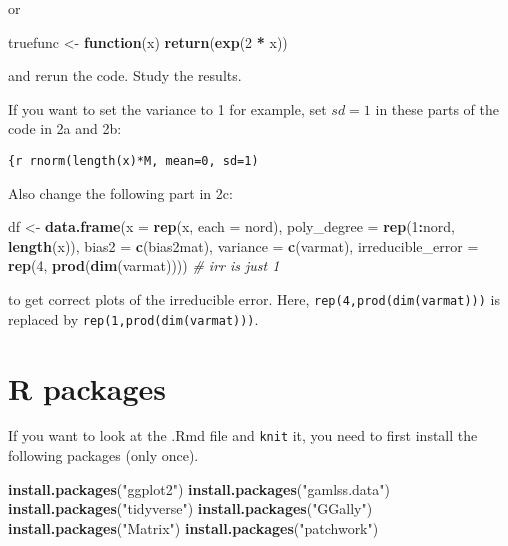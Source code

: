\documentclass[
]{article}
\newenvironment{Shaded}{\begin{snugshade}}{\end{snugshade}}
\newcommand{\AttributeTok}[1]{\textcolor[rgb]{0.13,0.29,0.53}{#1}}
\newcommand{\CommentTok}[1]{\textcolor[rgb]{0.56,0.35,0.01}{\textit{#1}}}
\newcommand{\ControlFlowTok}[1]{\textcolor[rgb]{0.13,0.29,0.53}{\textbf{#1}}}
\newcommand{\DecValTok}[1]{\textcolor[rgb]{0.00,0.00,0.81}{#1}}
\newcommand{\FunctionTok}[1]{\textcolor[rgb]{0.13,0.29,0.53}{\textbf{#1}}}
\newcommand{\NormalTok}[1]{#1}
\newcommand{\OtherTok}[1]{\textcolor[rgb]{0.56,0.35,0.01}{#1}}
\newcommand{\SpecialCharTok}[1]{\textcolor[rgb]{0.81,0.36,0.00}{\textbf{#1}}}
\newcommand{\StringTok}[1]{\textcolor[rgb]{0.31,0.60,0.02}{#1}}
\begin{document}
or

\begin{Shaded}
\begin{Highlighting}[]
\NormalTok{truefunc }\OtherTok{\textless{}{-}} \ControlFlowTok{function}\NormalTok{(x) }\FunctionTok{return}\NormalTok{(}\FunctionTok{exp}\NormalTok{(}\DecValTok{2} \SpecialCharTok{*}\NormalTok{ x))}
\end{Highlighting}
\end{Shaded}

and rerun the code. Study the results.

If you want to set the variance to 1 for example, set \(sd=1\) in these
parts of the code in 2a and 2b:

\texttt{\{r\ rnorm(length(x)*M,\ mean=0,\ sd=1)}

Also change the following part in 2c:

\begin{Shaded}
\begin{Highlighting}[]
\NormalTok{df }\OtherTok{\textless{}{-}} \FunctionTok{data.frame}\NormalTok{(}\AttributeTok{x =} \FunctionTok{rep}\NormalTok{(x, }\AttributeTok{each =}\NormalTok{ nord), }\AttributeTok{poly\_degree =} \FunctionTok{rep}\NormalTok{(}\DecValTok{1}\SpecialCharTok{:}\NormalTok{nord, }\FunctionTok{length}\NormalTok{(x)), }
                 \AttributeTok{bias2 =} \FunctionTok{c}\NormalTok{(bias2mat), }\AttributeTok{variance =} \FunctionTok{c}\NormalTok{(varmat), }
                 \AttributeTok{irreducible\_error =} \FunctionTok{rep}\NormalTok{(}\DecValTok{4}\NormalTok{, }\FunctionTok{prod}\NormalTok{(}\FunctionTok{dim}\NormalTok{(varmat)))) }\CommentTok{\# irr is just 1}
\end{Highlighting}
\end{Shaded}

to get correct plots of the irreducible error. Here,
\texttt{rep(4,prod(dim(varmat)))} is replaced by
\texttt{rep(1,prod(dim(varmat)))}.

\section{\texorpdfstring{ R packages}{ R packages}}\label{r-packages}

If you want to look at the .Rmd file and \texttt{knit} it, you need to
first install the following packages (only once).

\begin{Shaded}
\begin{Highlighting}[]
\FunctionTok{install.packages}\NormalTok{(}\StringTok{"ggplot2"}\NormalTok{)}
\FunctionTok{install.packages}\NormalTok{(}\StringTok{"gamlss.data"}\NormalTok{)}
\FunctionTok{install.packages}\NormalTok{(}\StringTok{"tidyverse"}\NormalTok{)}
\FunctionTok{install.packages}\NormalTok{(}\StringTok{"GGally"}\NormalTok{)}
\FunctionTok{install.packages}\NormalTok{(}\StringTok{"Matrix"}\NormalTok{)}
\FunctionTok{install.packages}\NormalTok{(}\StringTok{"patchwork"}\NormalTok{)}
\end{Highlighting}
\end{Shaded}
\end{document}
